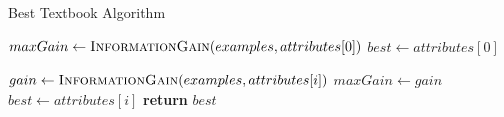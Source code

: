 \begin{algorithm}[H]
\caption{Best Textbook Algorithm}\label{a:id3-best-simple}
\begin{algorithmic}[1]
    \State $maxGain \gets \textsc{InformationGain}(examples, attributes[0])$
    \State $best \gets attributes[0]$

        \State $gain \gets  \textsc{InformationGain}(examples, attributes[i])$
            \State $maxGain \gets gain$
            \State $best \gets attributes[i]$
        \EndIf
    \EndFor
    \State \textbf{return} $best$
\EndProcedure
\end{algorithmic}
\end{algorithm}